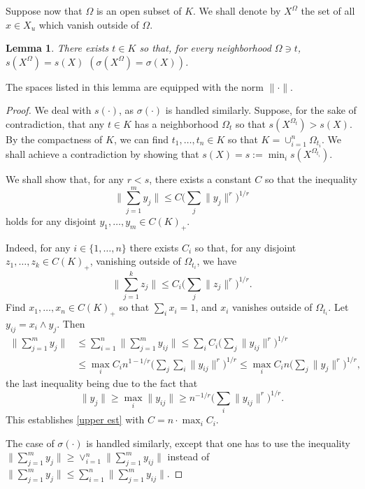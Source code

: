 \documentclass[12pt,leqno]{amsart}
\newtheorem{lemma}[theorem]{Lemma}
\numberwithin{equation}{section}
\theoremstyle{definition}
\begin{document}
Suppose now that $\Omega$ is an open subset of $K$. We shall denote by $X^\Omega$ the set of all $x \in X_u$ which vanish outside of $\Omega$.


\begin{lemma}\label{good-point}
    There exists $t \in K$ so that, for every neighborhood $\Omega \ni t$, $s(X^\Omega) = s(X)$ $(\sigma(X^\Omega) = \sigma(X))$.
\end{lemma}

The spaces listed in this lemma are equipped with the norm $\| \cdot \|$. 

\begin{proof}
We deal with $s( \cdot )$, as $\sigma( \cdot )$ is handled similarly.
    Suppose, for the sake of contradiction, that any $t \in K$ has a neighborhood $\Omega_t$ so that $s(X^{\Omega_t}) > s(X)$. By the compactness of $K$, we can find $t_1, \ldots, t_n \in K$ so that $K = \cup_{i=1}^n \Omega_{t_i}$. We shall achieve a contradiction by showing that $s(X) = s:= \min_i s(X^{\Omega_{t_i}})$.
\medskip

    We shall show that, for any $r < s$, there exists a constant $C$ so that the inequality
    \begin{equation}
    \big\| \sum_{j=1}^m y_j \big\| \leq C \big( \sum_j \|y_j\|^r \big)^{1/r} 
    \label{upper est}
    \end{equation}
    holds for any disjoint $y_1, \ldots, y_m \in C(K)_+$.
\medskip

    Indeed, for any $i \in \{1, \ldots,n\}$ there exists $C_i$ so that, for any disjoint $z_1, \ldots, z_k \in C(K)_+$, vanishing outside of $\Omega_{t_i}$, we have
    $$
    \big\| \sum_{j=1}^k z_j \big\| \leq C_i \big( \sum_j \|z_j\|^r \big)^{1/r} .
    $$
 Find $x_1, \ldots, x_n \in C(K)_+$ so that $\sum_i x_i = 1$, and $x_i$ vanishes outside of $\Omega_{t_i}$. Let $y_{ij} = x_i \wedge y_j$. Then
    \begin{align*}
    \big\| \sum_{j=1}^m y_j \big\| 
    &
    \leq \sum_{i=1}^n \big\| \sum_{j=1}^m y_{ij} \big\| \leq \sum_i C_i \big( \sum_j \|y_{ij}\|^r \big)^{1/r}  
    \\
    &
    \leq \max_i C_i n^{1-1/r} \big( \sum_j \sum_i \|y_{ij}\|^r \big)^{1/r} \leq \max_i C_i n \big( \sum_j \|y_j\|^r \big)^{1/r}  ,
    \end{align*}
    the last inequality being due to the fact that
    $$
    \|y_j\| \geq \max_i \|y_{ij}\| \geq n^{-1/r} \big( \sum_i \|y_{ij}\|^r \big)^{1/r} .
    $$
    This establishes \eqref{upper est} with $C = n \cdot \max_i C_i$.
\medskip

    The case of $\sigma( \cdot )$ is handled similarly, except that one has to use the inequality $\big\| \sum_{j=1}^m y_j \big\| 
    \geq \vee_{i=1}^n \big\| \sum_{j=1}^m y_{ij} \big\|$ instead of $\big\| \sum_{j=1}^m y_j \big\| 
    \leq \sum_{i=1}^n \big\| \sum_{j=1}^m y_{ij} \big\|$.
\end{proof}
\end{document}
